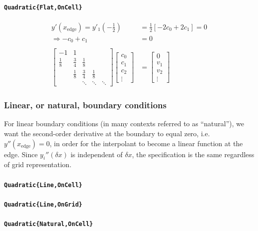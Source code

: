 \documentclass{article}
\begin{document}
\paragraph{\texttt{Quadratic\{Flat,OnCell\}}}
\begin{align*}
y'(x_{\text{edge}}) = y'_1\left(-\frac{1}{2}\right) &= \frac{1}{2}\left[-2c_0 + 2c_1\right] = 0\\
\Rightarrow -c_0 + c_1 &= 0
\\
\\
\begin{bmatrix} 
-1 & 1 \\
\frac{1}{8} & \frac{3}{4} & \frac{1}{8} \\
 & \frac{1}{8} & \frac{3}{4} & \frac{1}{8} \\
 & & \ddots & \ddots & \ddots
\end{bmatrix}
\begin{bmatrix}c_0\\ c_1\\ c_2\\\vdots\end{bmatrix}
&=
\begin{bmatrix}0\\ v_1 \\ v_2 \\\vdots\end{bmatrix}
\end{align*}

\subsubsection{Linear, or natural, boundary conditions}

For linear boundary conditions (in many contexts referred to as ``natural''), we want the second-order derivative at the boundary to equal zero, i.e. $y''(x_{\text{edge}}) = 0$, in order for the interpolant to become a linear function at the edge. Since $y_i''(\delta x)$ is independent of $\delta x$, the specification is the same regardless of grid representation.

\paragraph{\texttt{Quadratic\{Line,OnCell\}}}
\paragraph{\texttt{Quadratic\{Line,OnGrid\}}}
\paragraph{\texttt{Quadratic\{Natural,OnCell\}}}
\end{document}
